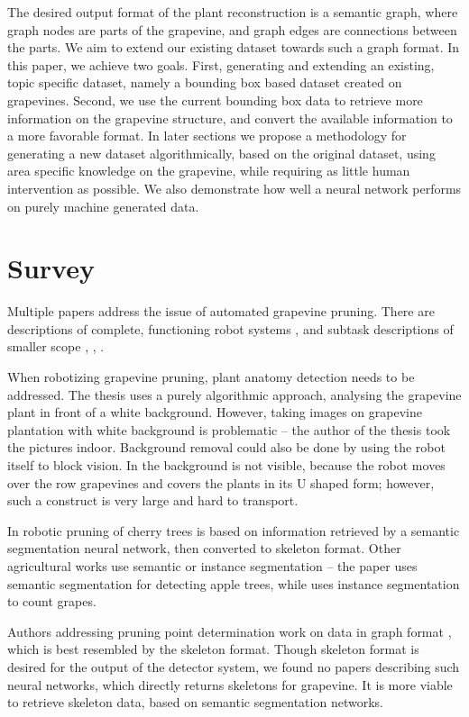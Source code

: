 \documentclass{PSAIE}%
\begin{document}
The desired output format of the plant reconstruction is a semantic graph, where graph nodes are parts
of the grapevine, and graph edges are connections between the parts. We aim to extend our existing
dataset towards such a graph format. In this paper, we achieve two goals. First, generating and
extending an existing, topic specific dataset, namely a bounding box based dataset created on grapevines.
Second, we use the current
bounding box data to retrieve more information on the grapevine structure, and convert the available
information to a more favorable format. In later sections we propose a methodology for generating a
new dataset algorithmically, based on the original dataset, using area specific knowledge on the
grapevine, while requiring as little human intervention as possible. We also demonstrate how well a
neural network performs on purely machine generated data.

\section{Survey} \label{sec_survey}
Multiple papers address the issue of automated grapevine pruning. There are descriptions of complete,
functioning robot systems \cite{botterill2017robot}, and subtask descriptions of smaller scope
\cite{goesmannai}, \cite{fernandes2021grapevine}, \cite{katyara2020reproducible}.

When robotizing grapevine pruning, plant anatomy detection needs to be addressed. The thesis
\cite{white_background_grape} uses a purely algorithmic approach, analysing the grapevine plant
in front of a white background. However, taking images on grapevine plantation with white background
is problematic -- the author of the thesis took the pictures indoor. Background removal could also be
done by using the robot itself to block vision. In \cite{botterill2017robot} the background is not
visible, because the robot moves over the row grapevines and covers the plants in its U shaped form;
however, such a construct is very large and hard to transport.

In \cite{you2021semantics} robotic pruning of cherry trees is based on information retrieved by a
semantic segmentation neural network, then converted to skeleton format. Other
agricultural works use semantic or instance segmentation -- the paper \cite{chen2021semantic} uses semantic
segmentation for detecting apple trees, while \cite{santos2020grape} uses instance segmentation to count
grapes.

Authors addressing pruning point determination work on data in graph format \cite{goesmannai}, which is best
resembled by the skeleton format. Though skeleton format is desired for the output of the detector system,
we found no papers describing such neural networks, which directly returns skeletons for grapevine.
It is more viable to retrieve skeleton data, based on \cite{you2021semantics} semantic segmentation networks.
\end{document}
